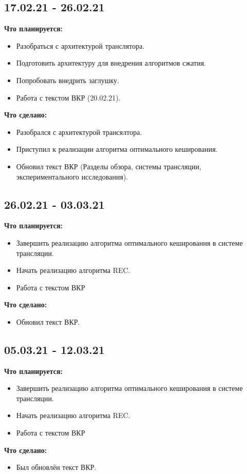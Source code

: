 \documentclass[a4peper, 12pt, titlepage, finall]{extreport}
\begin{document}
        \subsection{17.02.21 - 26.02.21}
            {\bf Что планируется:}
            \begin{itemize}
                \item Разобраться с архитектурой транслятора.
                \item Подготовить архитектуру для внедрения алгоритмов сжатия.
                \item Попробовать внедрить заглушку.
                \item Работа с текстом ВКР (20.02.21).
            \end{itemize}
            {\bf Что сделано:}
            \begin{itemize}
                \item Разобрался с архитектурой трансялтора.
                \item Приступил к реализации алгоритма оптимального кеширования.
                \item Обновил текст ВКР (Разделы обзора, системы трансляции, экспериментального исследования).
            \end{itemize}
        \subsection{26.02.21 - 03.03.21}
            {\bf Что планируется:}
            \begin{itemize}
                \item Завершить реализацию алгоритма оптимального кеширования в системе трансляции.
                \item Начать реализацию алгоритма REC.
                \item Работа с текстом ВКР
            \end{itemize}
           {\bf Что сделано:}
            \begin{itemize}
                \item Обновил текст ВКР.
            \end{itemize}
        \subsection{05.03.21 - 12.03.21}
            {\bf Что планируется:}
            \begin{itemize}
                \item Завершить реализацию алгоритма оптимального кеширования в системе трансляции.
                \item Начать реализацию алгоритма REC.
                \item Работа с текстом ВКР
            \end{itemize}
            {\bf Что сделано:}
            \begin{itemize}
                \item Был обновлён текст ВКР.
            \end{itemize}
\end{document}
